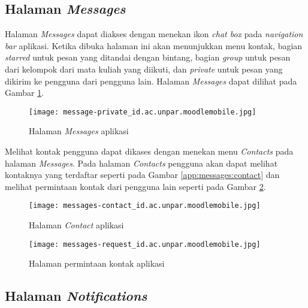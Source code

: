 \subsection{Halaman \textit{Messages}}

Halaman \textit{Messages} dapat diakses dengan menekan ikon \textit{chat box} pada \textit{navigation bar} aplikasi. Ketika dibuka halaman ini akan menunjukkan menu kontak, bagian \textit{starred} untuk pesan yang ditandai dengan bintang, bagian \textit{group} untuk pesan dari kelompok dari mata kuliah yang diikuti, dan \textit{private} untuk pesan yang dikirim ke pengguna dari pengguna lain. Halaman \textit{Messages} dapat dilihat pada Gambar \ref{app:messages}.


\begin{figure}[H] 
	\centering  
	\texttt{[image: message-private\_id.ac.unpar.moodlemobile.jpg]}  
	\caption[Halaman \textit{Messages} aplikasi] {Halaman \textit{Messages} aplikasi} 
	\label{app:messages} 
\end{figure}  

Melihat kontak pengguna dapat dikases dengan menekan menu \textit{Contacts} pada halaman \textit{Messages}. Pada halaman \textit{Contacts} pengguna akan dapat melihat kontaknya yang terdaftar seperti pada Gambar \ref{app:messages:contact} dan melihat permintaan kontak dari pengguna lain seperti pada Gambar \ref{app:messages:request}.

\begin{figure}[H]
\centering
\begin{minipage}{.3\textwidth} 
	\centering  
	\texttt{[image: messages-contact\_id.ac.unpar.moodlemobile.jpg]}  
	\caption[Halaman \textit{Contact} aplikasi] {Halaman \textit{Contact} aplikasi} 
	\label{app:messages:contact} 
\end{minipage}
\hspace{.2\textwidth}
\begin{minipage}{.3\textwidth}
	\centering  
	\texttt{[image: messages-request\_id.ac.unpar.moodlemobile.jpg]}  
	\caption[Halaman permintaan kontak aplikasi] {Halaman permintaan kontak aplikasi} 
	\label{app:messages:request} 
\end{minipage}
\end{figure}

\subsection{Halaman \textit{Notifications}}

